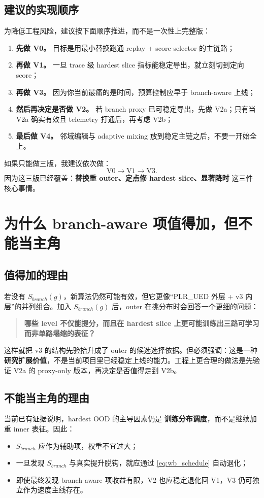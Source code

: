 \documentclass[11pt,a4paper]{ctexart}
\begin{document}
\subsection{建议的实现顺序}
为降低工程风险，建议按下面顺序推进，而不是一次性上完整版：
\begin{enumerate}[leftmargin=2.2em,itemsep=0.3em]
    \item \textbf{先做 V0。} 目标是用最小替换跑通 replay + score-selector 的主链路；
    \item \textbf{再做 V1。} 一旦 trace 级 hardest slice 指标能稳定导出，就立刻切到定向 score；
    \item \textbf{再做 V3。} 因为你当前最痛的是时间，预算控制应早于 branch-aware 上线；
    \item \textbf{然后再决定是否做 V2。} 若 branch proxy 已可稳定导出，先做 V2a；只有当 V2a 确实有效且 telemetry 打通后，再考虑 V2b；
    \item \textbf{最后做 V4。} 邻域编辑与 adaptive mixing 放到稳定主链之后，不要一开始全上。
\end{enumerate}

如果只能做三版，我建议依次做：
\[
\text{V0} \rightarrow \text{V1} \rightarrow \text{V3}.
\]
因为这三版已经覆盖：\textbf{替换重 outer、定点修 hardest slice、显著降时} 这三件核心事情。

\section{为什么 branch-aware 项值得加，但不能当主角}
\subsection{值得加的理由}
若没有 \(S_{branch}(g)\)，新算法仍然可能有效，但它更像“PLR\_UED 外层 + v3 内层”的并列组合。加入 \(S_{branch}(g)\) 后，outer 在挑分布时会回答一个更细的问题：
\begin{quote}
\textbf{哪些 level 不仅能提分，而且在 hardest slice 上更可能训练出三路可学习而非单路塌缩的表征？}
\end{quote}
这样就把 v3 的结构先验抬升成了 outer 的候选选择依据。但必须强调：这是一种\textbf{研究扩展价值}，不是当前项目里已经稳定上线的能力。工程上更合理的做法是先验证 V2a 的 proxy-only 版本，再决定是否值得走到 V2b。

\subsection{不能当主角的理由}
当前已有证据说明，hardest OOD 的主导因素仍是 \textbf{训练分布调度}，而不是继续加重 inner 表征。因此：
\begin{itemize}[leftmargin=2.2em,itemsep=0.2em]
    \item \(S_{branch}\) 应作为辅助项，权重不宜过大；
    \item 一旦发现 \(S_{branch}\) 与真实提升脱钩，就应通过 \eqref{eq:wb_schedule} 自动退化；
    \item 即使最终发现 branch-aware 项收益有限，V2 也应稳定退化回 V1，V3 仍可独立作为速度主线存在。 
\end{itemize}
\end{document}
